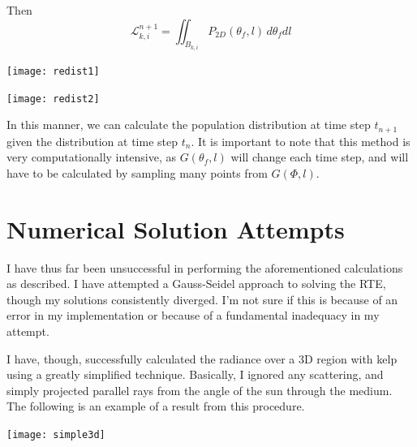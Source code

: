 \documentclass[10pt]{article}
\newenvironment{mcfig}
	{\par\medskip\noindent\minipage{\linewidth}}
	{\endminipage\par\medskip}
\newcommand\LL{\mathcal{L}}
\begin{document}
\begin{multicols}{2}
Then
\begin{equation}
	\LL_{k,i}^{n+1} = \iint_{B_{k,i}} P_{2D}(\theta_f,l)\,d\theta_fdl
	\label{eqn:redistribution}
\end{equation}

\begin{mcfig}
	\centering
	\texttt{[image: redist1]}
\end{mcfig}

\begin{mcfig}
	\centering
	\texttt{[image: redist2]}
\end{mcfig}

In this manner, we can calculate the population distribution at time step $t_{n+1}$ given the distribution at time step $t_n$.
It is important to note that this method is very computationally intensive, as $G(\theta_f,l)$ will change each time step, and will have to be calculated by sampling many points from $G(\Phi,l)$.
\section{Numerical Solution Attempts}
I have thus far been unsuccessful in performing the aforementioned calculations as described.
I have attempted a Gauss-Seidel approach to solving the RTE, though my solutions consistently diverged.
I'm not sure if this is because of an error in my implementation or because of a fundamental inadequacy in my attempt.

I have, though, successfully calculated the radiance over a 3D region with kelp using a greatly simplified technique.
Basically, I ignored any scattering, and simply projected parallel rays from the angle of the sun through the medium. The following is an example of a result from this procedure.

\begin{mcfig}
	\centering
	\texttt{[image: simple3d]}
\end{mcfig}


\end{multicols}
\end{document}
